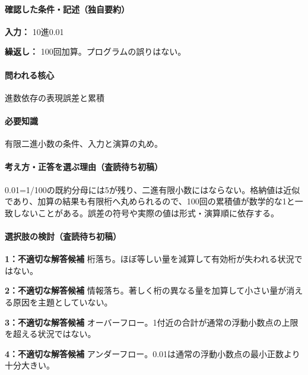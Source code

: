 \paragraph{確認した条件・記述（独自要約）}\mbox{}\par

\noindent\textbf{入力：} 10進0.01\par

\noindent\textbf{繰返し：} 100回加算。プログラムの誤りはない。\par

\paragraph{問われる核心} 進数依存の表現誤差と累積

\paragraph{必要知識} 有限二進小数の条件、入力と演算の丸め。

\paragraph{考え方・正答を選ぶ理由（査読待ち初稿）} 0.01=\allowbreak{}1/100の既約分母には5が残り、二進有限小数にはならない。格納値は近似であり、加算の結果も有限桁へ丸められるので、100回の累積値が数学的な1と一致しないことがある。誤差の符号や実際の値は形式・演算順に依存する。

\paragraph{選択肢の検討（査読待ち初稿）}\mbox{}\par

\noindent\textbf{1：不適切な解答候補} 桁落ち。ほぼ等しい量を減算して有効桁が失われる状況ではない。\par

\noindent\textbf{2：不適切な解答候補} 情報落ち。著しく桁の異なる量を加算して小さい量が消える原因を主題としていない。\par

\noindent\textbf{3：不適切な解答候補} オーバーフロー。1付近の合計が通常の浮動小数点の上限を超える状況ではない。\par

\noindent\textbf{4：不適切な解答候補} アンダーフロー。0.01は通常の浮動小数点の最小正数より十分大きい。\par

